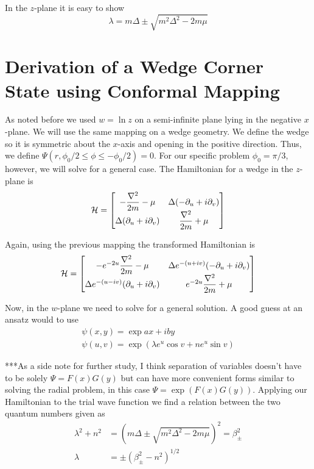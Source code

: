 In the $z$-plane it is easy to show
\begin{equation}
  \lambda = m\Delta \pm \sqrt{m^2\Delta^2 - 2m\mu}
\end{equation}

\section{Derivation of a Wedge Corner State using Conformal Mapping}

As noted before we used $w = \ln{z}$ on a semi-infinite plane lying in the negative $x$-plane.
We will use the same mapping on a wedge geometry.
We define the wedge so it is symmetric about the $x$-axis and opening in the positive direction.
Thus, we define $\Psi(r,\phi_0/2 \leq \phi \leq -\phi_0/2) = 0$.
For our specific problem $\phi_0 = \pi / 3$, however, we will solve for a general case.
The Hamiltonian for a wedge in the $z$-plane is
\begin{align}
  \mathcal{H} = 
  \begin{bmatrix}
    -\dfrac{\nabla^2}{2m} - \mu & \Delta (-\partial_u + i \partial_v) \\
    \Delta (\partial_u +i\partial_v) & \dfrac{\nabla^2}{2m} + \mu
  \end{bmatrix}
\end{align}

Again, using the previous mapping the transformed Hamiltonian is
\begin{align}
  \mathcal{H} = 
  \begin{bmatrix}
    -e^{-2u}\dfrac{\nabla^2}{2m} - \mu & \Delta e^{-(u+iv)} (-\partial_u + i \partial_v) \\
    \Delta e^{-(u-iv)}(\partial_u +i\partial_v) & e^{-2u}\dfrac{\nabla^2}{2m} + \mu
  \end{bmatrix}
\end{align}

Now, in the $w$-plane we need to solve for a general solution.
A good guess at an ansatz would to use
\begin{align*}
  \psi(x,y) = \exp{a x + i b y} \\
  \psi(u,v) = \exp(\lambda e^u \cos{v} + n e^u \sin{v} )
\end{align*}

***As a side note for further study, I think separation of variables doesn't have to be solely $\Psi = F(x)G(y)$ but can have more convenient forms similar to solving the radial problem, in this case $\Psi = \exp(F(x)G(y))$.
Applying our Hamiltonian to the trial wave function we find a relation between the two quantum numbers given as
\begin{align*}
  \lambda^2 + n^2 & = \left(m\Delta \pm \sqrt{m^2\Delta^2 - 2m\mu}\right)^2 = \beta_{\pm}^2 \\
  \lambda &= \pm \left(\beta_{\pm}^2 - n^2 \right)^{1/2}
\end{align*}


